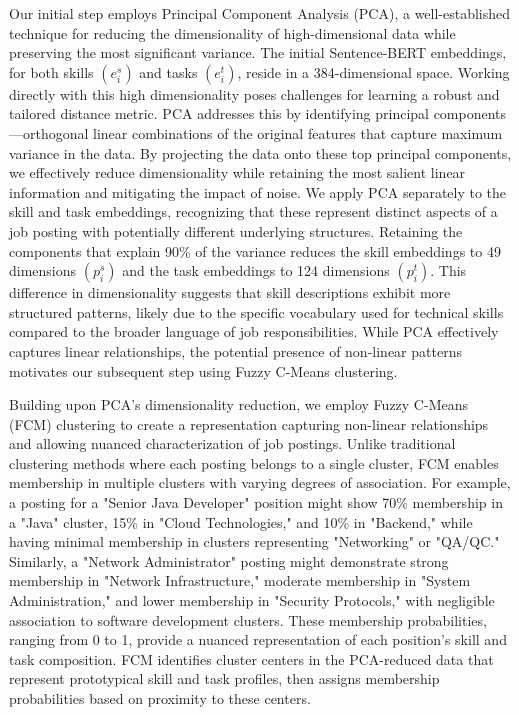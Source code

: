 Our initial step employs Principal Component Analysis (PCA), a well-established technique for reducing the 
dimensionality of high-dimensional data while preserving the most significant variance. The initial 
Sentence-BERT embeddings, for both skills $(e_i^s)$ and tasks $(e_i^t)$, reside in a 384-dimensional space. 
Working directly with this high dimensionality poses challenges for learning a robust and tailored distance metric. 
PCA addresses this by identifying principal components---orthogonal linear combinations of the original features that 
capture maximum variance in the data. By projecting the data onto these top principal components, we effectively 
reduce dimensionality while retaining the most salient linear information and mitigating the impact of noise. 
We apply PCA separately to the skill and task embeddings, recognizing that these represent distinct aspects of 
a job posting with potentially different underlying structures. Retaining the components that explain 90\% of 
the variance reduces the skill embeddings to 49 dimensions $(p_i^s)$ and the task embeddings to 124 dimensions 
$(p_i^t)$. This difference in dimensionality suggests that skill descriptions exhibit more structured patterns, 
likely due to the specific vocabulary used for technical skills compared to the broader language of job 
responsibilities. While PCA effectively captures linear relationships, the potential presence of 
non-linear patterns motivates our subsequent step using Fuzzy C-Means clustering.


Building upon PCA's dimensionality reduction, we employ Fuzzy C-Means (FCM) clustering to create a representation 
capturing non-linear relationships and allowing nuanced characterization of job postings. Unlike traditional 
clustering methods where each posting belongs to a single cluster, FCM enables membership in multiple clusters 
with varying degrees of association. For example, a posting for a "Senior Java Developer" position might show 
70\% membership in a "Java" cluster, 15\% in "Cloud Technologies," and 10\% in 
"Backend," while having minimal membership in clusters representing "Networking" 
or "QA/QC." Similarly, a "Network Administrator" posting might demonstrate strong membership in 
"Network Infrastructure," moderate membership in "System Administration," and 
lower membership in "Security Protocols," with negligible association to software development clusters. 
These membership probabilities, ranging from 0 to 1, provide a nuanced representation of each position's 
skill and task composition. FCM identifies cluster centers in the PCA-reduced data that represent 
prototypical skill and task profiles, then assigns membership probabilities based on proximity to these centers.


